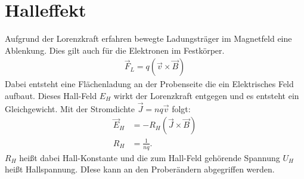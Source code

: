 \section{Halleffekt}

Aufgrund der Lorenzkraft erfahren bewegte Ladungsträger im Magnetfeld eine Ablenkung. Dies gilt auch für die Elektronen im Festkörper. 
\begin{align}
    \Vec{F}_L = q(\Vec{v} \times \Vec{B})
\end{align}
Dabei entsteht eine Flächenladung an der Probenseite die ein Elektrisches Feld aufbaut. Dieses Hall-Feld $E_H$ wirkt der Lorenzkraft entgegen und es entsteht ein Gleichgewicht. Mit der Stromdichte $ \Vec{J} = nq\Vec{v}$ folgt:
\begin{align}
    \Vec{E}_H &= -R_H ( \Vec{J} \times \Vec{B} ) \\
    R_H &= \frac{1}{nq}.
\end{align}
$R_H$ heißt dabei Hall-Konstante und die zum Hall-Feld gehörende Spannung $U_H$ heißt Hallspannung. DIese kann an den Proberändern abgegriffen werden.\\


